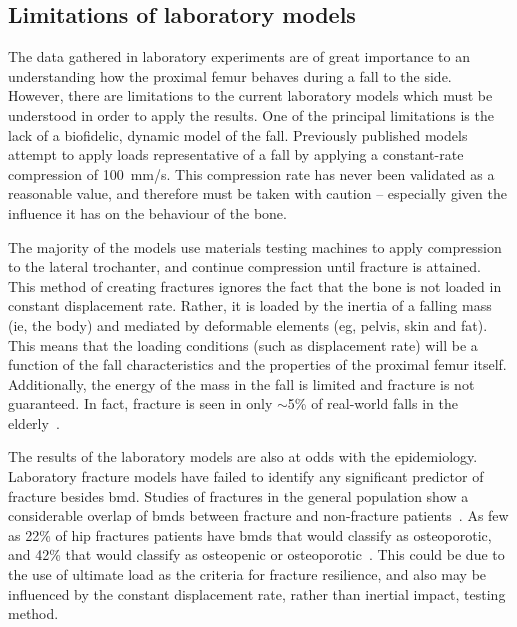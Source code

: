 \subsection{Limitations of laboratory models}
\label{sec:intro_understanding_modelling_lab_limits}
The data gathered in laboratory experiments are of great importance to an understanding how the proximal femur behaves during a fall to the side.
However, there are limitations to the current laboratory models which must be understood in order to apply the results.
One of the principal limitations is the lack of a biofidelic, dynamic model of the fall.
Previously published models attempt to apply loads representative of a fall by applying a constant-rate compression of 100~\ac{mm}/\ac{s}.
This compression rate has never been validated as a reasonable value, and therefore must be taken with caution -- especially given the influence it has on the behaviour of the bone.

The majority of the models use materials testing machines to apply compression to the lateral trochanter, and continue compression until fracture is attained.
This method of creating fractures ignores the fact that the bone is not loaded in constant displacement rate.
Rather, it is loaded by the inertia of a falling mass (\ac{ie}, the body) and mediated by deformable elements (\ac{eg}, pelvis, skin and fat).
This means that the loading conditions (such as displacement rate) will be a function of the fall characteristics and the properties of the proximal femur itself. 
Additionally, the energy of the mass in the fall is limited and fracture is not guaranteed.
In fact, fracture is seen in only $\sim$5\% of real-world falls in the elderly~\citep{masud_epidemiology_2001, nachreiner_circumstances_2007}.

The results of the laboratory models are also at odds with the epidemiology.
Laboratory fracture models have failed to identify any significant predictor of fracture besides \ac{bmd}.
Studies of fractures in the general population show a considerable overlap of \acp{bmd} between fracture and non-fracture patients~\citep{greenspan_fall_1994, faulkner_simple_1993}.
As few as 22\% of hip fractures patients have \acp{bmd} that would classify as osteoporotic, and 42\% that would classify as osteopenic or osteoporotic~\citep{stone_bmd_2003}.
This could be due to the use of ultimate load as the criteria for fracture resilience, and also may be influenced by the constant displacement rate, rather than inertial impact, testing method.		

